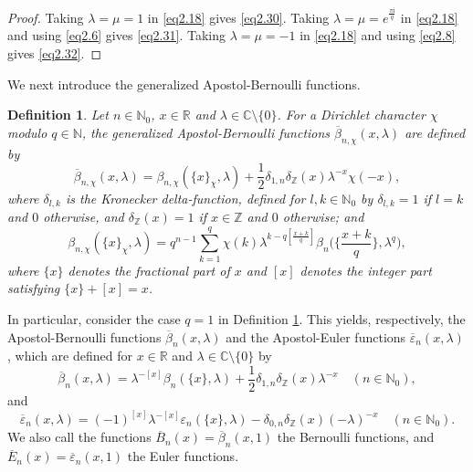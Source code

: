 \documentclass[reqno]{amsart}
\numberwithin{equation}{section}
\newtheorem{definition}[thm]{Definition}
\begin{document}
\begin{proof}
Taking $\lambda=\mu=1$ in \eqref{eq2.18} gives \eqref{eq2.30}. Taking $\lambda=\mu=e^{\frac{\pi \mathrm{i}}{q}}$ in \eqref{eq2.18} and using \eqref{eq2.6} gives \eqref{eq2.31}. Taking $\lambda=\mu=-1$ in \eqref{eq2.18} and using \eqref{eq2.8} gives \eqref{eq2.32}.
\end{proof}

We next introduce the generalized Apostol-Bernoulli functions.

\begin{definition}\label{def2.7} Let $n\in\mathbb{N}_{0}$, $x\in\mathbb{R}$ and $\lambda\in\mathbb{C}\setminus\{0\}$. For a Dirichlet character $\chi$ modulo $q\in\mathbb{N}$, the generalized Apostol-Bernoulli functions $\overline{\beta}_{n,\chi}(x,\lambda)$ are defined by
\begin{equation}\label{eq2.33}
\overline{\beta}_{n,\chi}(x,\lambda)=
\beta_{n,\chi}(\{x\}_{\chi},\lambda)+\frac{1}{2}\delta_{1,n}\delta_{\mathbb{Z}}(x)\lambda^{-x}\chi(-x),
\end{equation}
where $\delta_{l,k}$ is the Kronecker delta-function, defined for $l,k\in\mathbb{N}_{0}$ by $\delta_{l,k}=1$ if $l=k$ and $0$ otherwise, and $\delta_{\mathbb{Z}}(x)=1$ if $x\in\mathbb{Z}$ and $0$ otherwise; and
\begin{equation}\label{eq2.34}
\beta_{n,\chi}(\{x\}_{\chi},\lambda)=q^{n-1}\sum_{k=1}^{q}\chi(k)\lambda^{k-q[\frac{x+k}{q}]}\beta_{n}\biggl(\biggl\{\frac{x+k}{q}\biggl\},\lambda^{q}\biggl),
\end{equation}
where $\{x\}$ denotes the fractional part of $x$ and $[x]$ denotes the integer part satisfying $\{x\}+[x]=x$.
\end{definition}

In particular, consider the case
$q=1$ in Definition \ref{def2.7}. This yields, respectively, the Apostol-Bernoulli functions $\overline{\beta}_{n}(x,\lambda)$ and the Apostol-Euler functions $\overline{\varepsilon}_{n}(x,\lambda)$, which are defined for $x\in\mathbb{R}$ and $\lambda\in\mathbb{C}\setminus\{0\}$ by
\begin{equation}\label{eq2.35}
\overline{\beta}_{n}(x,\lambda)=\lambda^{-[x]}\beta_{n}(\{x\},\lambda)+\frac{1}{2}\delta_{1,n}\delta_{\mathbb{Z}}(x)\lambda^{-x}\quad(n\in\mathbb{N}_{0}),
\end{equation}
and
\begin{equation}\label{eq2.36}
\overline{\varepsilon}_{n}(x,\lambda)=(-1)^{[x]}\lambda^{-[x]}\varepsilon_{n}(\{x\},\lambda)-\delta_{0,n}\delta_{\mathbb{Z}}(x)(-\lambda)^{-x}\quad(n\in\mathbb{N}_{0}).
\end{equation}
We also call the functions $\overline{B}_{n}(x)=\overline{\beta}_{n}(x,1)$ the Bernoulli functions, and $\overline{E}_{n}(x)=\overline{\varepsilon}_{n}(x,1)$ the Euler functions.
\end{document}
